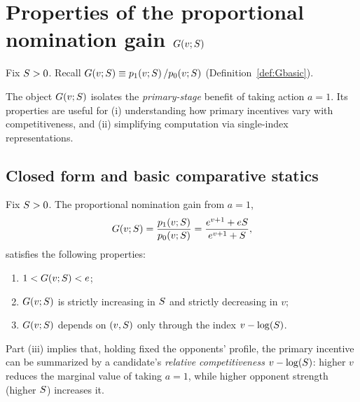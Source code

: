 \section{Properties of the proportional nomination gain $G\!\left(v;S\right)$}

Fix $S>0$. Recall $G\!\left(v;S\right)\equiv p_{1}\!\left(v;S\right)/p_{0}\!\left(v;S\right)$ (Definition~\ref{def:Gbasic}).

The object $G\!\left(v;S\right)$ isolates the \emph{primary-stage} benefit of taking action $a=1$.
Its properties are useful for (i) understanding how primary incentives vary with competitiveness,
and (ii) simplifying computation via single-index representations.


\subsection{Closed form and basic comparative statics}

\begin{lemma}\label{lem:Gbasic}
Fix $S > 0$. The proportional nomination gain from $a = 1$,
\[
    G\!\left(v;S\right) = \frac{p_{1}\!\left(v;S\right)}{p_{0}\!\left(v;S\right)} = \frac{e^{v+1} + eS}{e^{v+1} + S},
\]
satisfies the following properties:
\begin{enumerate}
    \item $1 < G\!\left(v;S\right) < e$;
    \item $G\!\left(v;S\right)$ is strictly increasing in $S$ and strictly decreasing in $v$;
    \item $G\!\left(v;S\right)$ depends on $(v, S)$ only through the index $v - \log\!\left(S\right)$.
\end{enumerate}
\end{lemma}


Part (iii) implies that, holding fixed the opponents' profile, the primary incentive can be summarized
by a candidate's \emph{relative competitiveness} $v-\log\!\left(S\right)$: higher $v$ reduces the marginal value
of taking $a=1$, while higher opponent strength (higher $S$) increases it.


